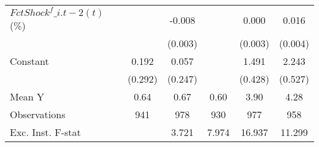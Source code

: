 {\begin{tabular}{l*{5}{c}}
\addlinespace
$ FctShock^f\_{i.t-2}(t)$ (\%)&                     &      -0.008\sym{**} &                     &       0.000         &       0.016\sym{***}\\
                    &                     &     (0.003)         &                     &     (0.003)         &     (0.004)         \\
\addlinespace
Constant            &       0.192         &       0.057         &                     &       1.491\sym{***}&       2.243\sym{***}\\
                    &     (0.292)         &     (0.247)         &                     &     (0.428)         &     (0.527)         \\
\midrule
Mean Y              &        0.64         &        0.67         &        0.60         &        3.90         &        4.28         \\
Observations        &         941         &         978         &         930         &         977         &         958         \\
Exc. Inst. F-stat   &                     &       3.721         &       7.974         &      16.937         &      11.299         \\
\bottomrule
\end{tabular}
}

